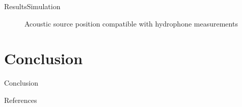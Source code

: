 \documentclass[9pt, xcolor={usenames, dvipsnames}]{beamer}
\begin{document}
\begin{frame}{Results}{Simulation}
\begin{minipage}[c]{0.48\textwidth}
\begin{figure}
						\caption{Acoustic source position compatible with hydrophone measurements}
					\end{figure}
				\end{minipage}
			\end{frame}

		\section{Conclusion}
		
			\begin{frame}{Conclusion}
				\centering
				\begin{minipage}{0.55\textwidth}
					
				\end{minipage}
				\hfill
				\begin{minipage}{0.4\textwidth}
					
				\end{minipage}
			\end{frame}
	
		\begin{frame}{References}
			\printbibliography
		\end{frame}
\end{document}
